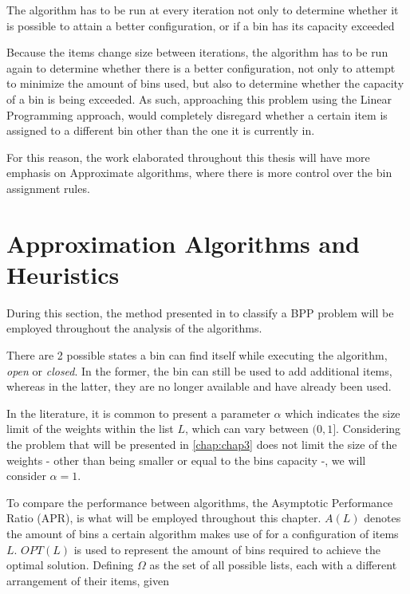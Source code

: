 The algorithm has to be run at every iteration not only to determine whether it
is possible to attain a better configuration, or if a bin has its capacity
exceeded 

Because the items change size between iterations, the algorithm has to be run
again to determine whether there is a better configuration, not only to attempt
to minimize the amount of bins used, but also to determine whether the capacity
of a bin is being exceeded. As such, approaching this problem using the
Linear Programming approach, would completely disregard whether a certain item
is assigned to a different bin other than the one it is currently in. 

For this reason, the work elaborated throughout this thesis will have more
emphasis on Approximate algorithms, where there is more control over the bin
assignment rules.

\section{Approximation Algorithms and Heuristics}
\label{sub:Approximation Algorithms and Heuristics}

During this section, the method presented in \cite{coffman2013bin} to classify a BPP problem will be employed throughout the analysis of the algorithms.

There are 2 possible states a bin can find itself while executing the algorithm, \textit{open} or \textit{closed}. In the former, the bin can still be used to add additional items, whereas in the latter, they are no longer available and have already been used.

In the literature, it is common to present a parameter $\alpha$ which indicates the size limit of the weights within the list $L$, which can vary between \( (0, 1] \). Considering the problem that will be presented in \ref{chap:chap3} does not limit the size of the weights - other than being smaller or equal to the bins capacity -, we will consider $\alpha = 1$. 

To compare the performance between algorithms, the Asymptotic Performance Ratio (APR), is what will be employed throughout this chapter. $A(L)$ denotes the amount of bins a certain algorithm makes use of for a configuration of items $L$. $OPT(L)$ is used to represent the amount of bins required to achieve the optimal solution. Defining $\Omega$ as the set of all possible lists, each with a different arrangement of their items, given 

